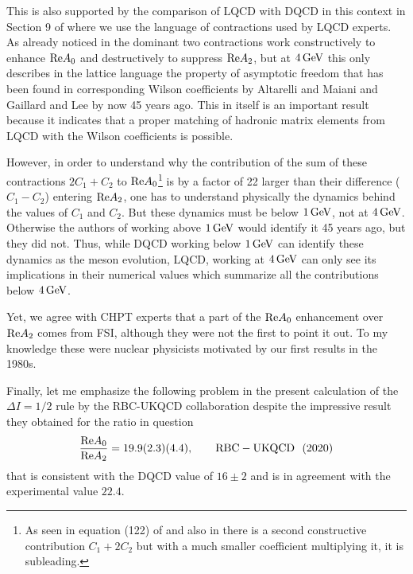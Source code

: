 \documentclass[12pt,a4paper]{article}
\newcommand{\RE}{{\rm Re}}
\newcommand{\gev}{\, {\rm GeV}}
\newcommand{\be}{\begin{equation}}
\newcommand{\ee}{\end{equation}}
\begin{document}
This is also supported by the comparison
of LQCD with DQCD in this context in Section 9 of \cite{Buras:2014maa} where
we use the language of contractions used by LQCD experts.
As already noticed in \cite{Boyle:2012ys} the dominant two contractions
work constructively to enhance ${\rm Re}A_0$ and destructively to suppress
${\rm Re}A_2$, but at $4\gev$ this only describes in the lattice language
the property of asymptotic freedom that has been found in corresponding
Wilson coefficients by Altarelli and Maiani \cite{Altarelli:1974exa} and Gaillard and Lee \cite{Gaillard:1974nj} by now 45 years ago. This in itself is an
important result because it indicates that a proper matching of hadronic
matrix elements from LQCD with the Wilson coefficients is possible.


However, in order to understand  why the contribution of the sum
of these contractions $2C_1+C_2$ to ${\rm Re}A_0$\footnote{As seen in equation (122)  of \cite{Buras:2014maa} and also in  \cite{Boyle:2012ys} there is a second constructive contribution $C_1+2C_2$ but with a much smaller coefficient multiplying it, it is subleading.} is by a factor of 22 larger than their difference ($C_1-C_2$) entering  ${\rm Re}A_2$, one has to understand physically the dynamics behind the values of $C_1$ and $C_2$. But these
dynamics must be  below $1\gev$, not at $4\gev$. Otherwise the authors of
\cite{Altarelli:1974exa,Gaillard:1974nj} working above $1\gev$ would identify it 45 years ago, but they did not. Thus, while DQCD working below $1\gev$ can
identify these dynamics as the meson evolution, LQCD, working at $4\gev$
can only see its implications in their numerical values which summarize
all the contributions below $4\gev$.

Yet, we agree with CHPT experts that a part of the ${\RE A_0}$ enhancement over
${\RE A_2}$ comes from FSI, although they were not the first to point it out.
To my knowledge these were nuclear physicists \cite{Brown:1990tt} motivated
by our first results in the 1980s.


Finally, let me emphasize the following  problem in the present calculation of the
$\Delta I=1/2$ rule by the RBC-UKQCD collaboration despite the impressive
result they obtained for the ratio in question 
\be\label{EB}
\frac{\RE A_0}{\RE A_2}=19.9(2.3)(4.4), \qquad {\rm RBC-UKQCD~~(2020)}
\ee
that is consistent with the DQCD value of $16\pm2$ and is in  agreement
with the experimental value $22.4$.
\end{document}
